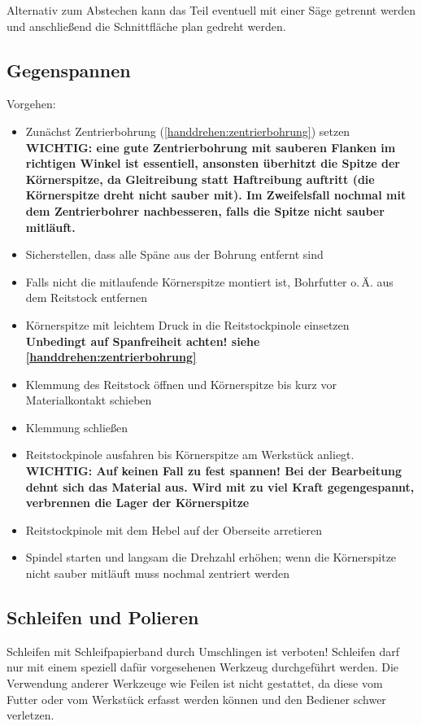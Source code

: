 \documentclass{\basedir/fablab-document}
\begin{document}
Alternativ zum Abstechen kann das Teil eventuell mit einer Säge getrennt werden und anschließend die Schnittfläche plan gedreht werden.




\subsection{Gegenspannen}
\label{handdrehen:gegenspannen}

Vorgehen:
\begin{itemize}
\item Zunächst Zentrierbohrung (\ref{handdrehen:zentrierbohrung}) setzen\\
	\textbf{WICHTIG: eine gute Zentrierbohrung mit sauberen Flanken im richtigen Winkel ist essentiell, ansonsten überhitzt die Spitze der Körnerspitze, da Gleitreibung statt Haftreibung auftritt (die Körnerspitze dreht nicht sauber mit). Im Zweifelsfall nochmal mit dem Zentrierbohrer nachbesseren, falls die Spitze nicht sauber mitläuft.} 
\item Sicherstellen, dass alle Späne aus der Bohrung entfernt sind
\item Falls nicht die mitlaufende Körnerspitze montiert ist, Bohrfutter o.\,Ä. aus dem Reitstock entfernen
\item Körnerspitze mit leichtem Druck in die Reitstockpinole einsetzen\\
\textbf{Unbedingt auf Spanfreiheit achten! siehe \ref{handdrehen:zentrierbohrung}}
\item Klemmung des Reitstock öffnen und Körnerspitze bis kurz vor Materialkontakt schieben 
\item Klemmung schließen
\item Reitstockpinole ausfahren bis Körnerspitze am Werkstück anliegt.\\
\textbf{WICHTIG: Auf keinen Fall zu fest spannen! Bei der Bearbeitung dehnt sich das Material aus. Wird mit zu viel Kraft gegengespannt, verbrennen die Lager der Körnerspitze}
\item Reitstockpinole mit dem Hebel auf der Oberseite arretieren
\item Spindel starten und langsam die Drehzahl erhöhen; wenn die Körnerspitze nicht sauber mitläuft muss nochmal zentriert werden
\end{itemize}

\subsection{Schleifen und Polieren}
Schleifen mit Schleifpapierband durch Umschlingen ist verboten!
Schleifen darf nur mit einem speziell dafür vorgesehenen Werkzeug durchgeführt werden. Die Verwendung anderer Werkzeuge wie Feilen ist nicht gestattet, da diese vom Futter oder vom Werkstück erfasst werden können und den Bediener schwer verletzen.
\end{document}
